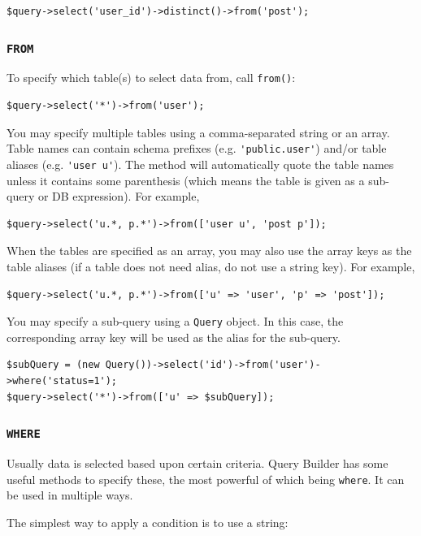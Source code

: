 \lstset{language=php}\begin{lstlisting}
$query->select('user_id')->distinct()->from('post');
\end{lstlisting}
\subsubsection{\lstinline|FROM|}
To specify which table(s) to select data from, call \lstinline|from()|:

\lstset{language=php}\begin{lstlisting}
$query->select('*')->from('user');
\end{lstlisting}
You may specify multiple tables using a comma-separated string or an array.
Table names can contain schema prefixes (e.g. \lstinline|'public.user'|) and/or table aliases (e.g. \lstinline|'user u'|).
The method will automatically quote the table names unless it contains some parenthesis
(which means the table is given as a sub-query or DB expression). For example,

\lstset{language=php}\begin{lstlisting}
$query->select('u.*, p.*')->from(['user u', 'post p']);
\end{lstlisting}
When the tables are specified as an array, you may also use the array keys as the table aliases
(if a table does not need alias, do not use a string key). For example,

\lstset{language=php}\begin{lstlisting}
$query->select('u.*, p.*')->from(['u' => 'user', 'p' => 'post']);
\end{lstlisting}
You may specify a sub-query using a \lstinline|Query| object. In this case, the corresponding array key will be used
as the alias for the sub-query.

\lstset{language=php}\begin{lstlisting}
$subQuery = (new Query())->select('id')->from('user')->where('status=1');
$query->select('*')->from(['u' => $subQuery]);
\end{lstlisting}
\subsubsection{\lstinline|WHERE|}
Usually data is selected based upon certain criteria. Query Builder has some useful methods to specify these, the most powerful of which being \lstinline|where|. It can be used in multiple ways.

The simplest way to apply a condition is to use a string:

